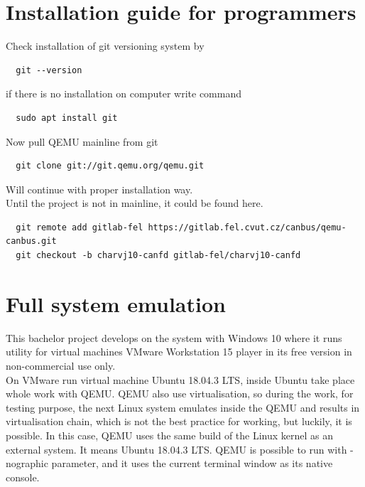 \documentclass{ctuthesis}
\begin{document}
 \section{Installation guide for programmers}
 Check installation of git versioning system by
 \begin{verbatim}  git --version\end{verbatim}
 if there is no installation on computer write command
 \begin{verbatim}  sudo apt install git\end{verbatim}
 Now pull QEMU mainline from git
 \begin{verbatim}  git clone git://git.qemu.org/qemu.git\end{verbatim}
 Will continue with proper installation way. \\
 Until the project is not in mainline, it could be found here.
 \begin{verbatim}  git remote add gitlab-fel https://gitlab.fel.cvut.cz/canbus/qemu-canbus.git
  git checkout -b charvj10-canfd gitlab-fel/charvj10-canfd\end{verbatim}
 \section{Full system emulation}
 This bachelor project develops on the system with Windows 10 where it runs utility for virtual machines VMware  Workstation 15 player in its free version in non-commercial use only. \cite{vmware} \\
 On VMware run virtual machine Ubuntu 18.04.3 LTS, \cite{ubuntu} inside Ubuntu take place whole work with QEMU. QEMU also use virtualisation, so during the work, for testing purpose, the next Linux system emulates inside the QEMU and results in virtualisation chain, which is not the best practice for working, but luckily, it is possible. In this case, QEMU uses the same build of the Linux kernel as an external system. It means Ubuntu 18.04.3 LTS. QEMU is possible to run with -nographic parameter, and it uses the current terminal window as its native console. \\
\end{document}

